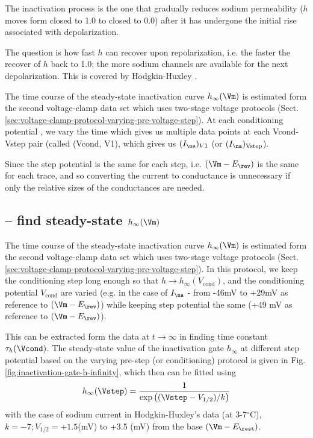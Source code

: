 The inactivation process is the one that gradually reduces sodium permeability
($h$ moves form closed to 1.0 to closed to 0.0) after it has undergone the
initial rise associated with depolarization.

The question is how fast $h$ can recover upon repolarization, i.e. the faster
the recover of $h$ back to 1.0; the more sodium channels are available for the
next depolarization. This is covered by Hodgkin-Huxley \citep{hodgkin1952dem}.

The time course of the steady-state inactivation curve $h_\infty(\Vm)$ is
estimated form the second voltage-clamp data set which uses two-stage voltage
protocols (Sect.\ref{sec:voltage-clamp-protocol-varying-pre-voltage-step}).
At each conditioning potential , we vary the time which gives us multiple data
points at each Vcond-Vstep pair (called (Vcond, V1), which gives us
$(I_\na)_{V1}$ (or $(I_\na)_\text{Vstep}$).

Since the step potential is the same for each step, i.e. $(\Vm - E_\rev)$ is the
same for each trace, and so converting the current to conductance is unnecessary
if only the relative sizes of the conductances are needed.



\subsection[-- find steady-state h-inf(Vm)]{-- find steady-state
$h_\infty(\Vm)$}
\label{sec:inactivation-steady-state-h_infty}

The time course of the steady-state inactivation curve $h_\infty(\Vm)$ is
estimated form the second voltage-clamp data set which uses two-stage voltage
protocols (Sect.\ref{sec:voltage-clamp-protocol-varying-pre-voltage-step}). In
this protocol, we keep the conditioning step long enough so that
$h \rightarrow h_\infty(V_\text{cond})$, and the conditioning potential
$V_\text{cond}$ are varied (e.g. in the case of $I_\na$ - from -46mV to +29mV as
reference to $(\Vm  - E_\rev)$) while keeping step potential the same (+49 mV as
reference to $(\Vm  - E_\rev)$).

This can be extracted form the data at $t \rightarrow \infty$ in finding time
constant $\tau_h(\Vcond)$. The steady-state value of the inactivation gate
$h_\infty$ at different step potential based on the varying pre-step (or
conditioning) protocol is given in Fig.\ref{fig:inactivation-gate-h-infinity},
which then can be fitted using
\begin{equation}
h_\infty(\Vstep) = \frac{1}{\exp\left( (\Vstep - V_{1/2})/k \right)}
\end{equation}
with the case of sodium current in Hodgkin-Huxley's data (at 3-7$^\circ$C),
$k=-7; V_{1/2}=+1.5$(mV) to +3.5 (mV) from the base $(\Vm -E_\rest)$.

